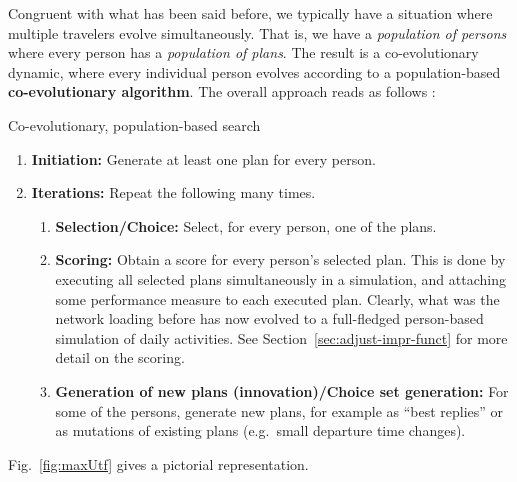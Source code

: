 Congruent with what has been said before, we typically have a
situation where multiple travelers evolve simultaneously.  That is, we
have a \emph{population of persons} where every person has a
\emph{population of plans}.  The result is a co-evolutionary dynamic,
where every individual person evolves according to a population-based
\textbf{co-evolutionary algorithm}.  The overall approach reads as
follows \citep[see, e.g.,][for a similar
  approaches]{HraberJonesForrestEcho,ArthurBar}:

\begin{algorithm}[H]

\caption{Co-evolutionary, population-based search}

\begin{enumerate}
\item \textbf{Initiation:} Generate at least one plan for every
  person.

\item \textbf{Iterations:} Repeat the following many times.

\begin{enumerate}

\item \textbf{Selection/Choice:} Select, for every person, one of the plans.

\item \textbf{Scoring:} Obtain a score for every person's selected
  plan.  This is done by executing all selected plans simultaneously
  in a simulation, and attaching some performance measure to each
  executed plan.  Clearly, what was the network loading before has now
  evolved to a full-fledged person-based simulation of daily
  activities.  See Section~\ref{sec:adjust-impr-funct} for more detail on
  the scoring.

\item \textbf{Generation of new plans (innovation)/Choice set
  generation:} For some of the persons, generate new plans, for
  example as ``best replies'' or as mutations of existing plans
  (e.g.\ small departure time changes).

\end{enumerate} %

\end{enumerate}

\end{algorithm}

Fig.~\ref{fig:maxUtf} gives a pictorial representation.

